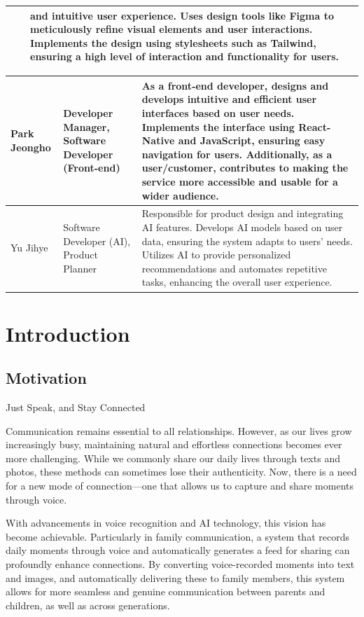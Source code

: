 \documentclass[conference]{IEEEtran}
\begin{document}
\begin{table}[htbp]
\begin{tabular}{|p{1cm}|p{1.7cm}|p{5cm}|}
    \hline
    & & and intuitive user experience. Uses design tools like Figma to meticulously refine visual elements and user interactions. Implements the design using stylesheets such as Tailwind, ensuring a high level of interaction and functionality for users.\\
    \hline
\end{tabular}

 \begin{tabular}{|p{1cm}|p{1.7cm}|p{5cm}|}
    Park Jeongho & Developer Manager, Software Developer (Front-end) & As a front-end developer, designs and develops intuitive and efficient user interfaces based on user needs. Implements the interface using React-Native and JavaScript, ensuring easy navigation for users. Additionally, as a user/customer, contributes to making the service more accessible and usable for a wider audience.\\
    \hline
    Yu Jihye & Software Developer (AI), Product Planner& Responsible for product design and integrating AI features. Develops AI models based on user data, ensuring the system adapts to users' needs. Utilizes AI to provide personalized recommendations and automates repetitive tasks, enhancing the overall user experience.\\
    \hline
\end{tabular}
\end{table}

\section{Introduction}
    \subsection{Motivation}
    Just Speak, and Stay Connected

    Communication remains essential to all relationships. However, as our lives grow increasingly busy, maintaining natural and effortless connections becomes ever more challenging. While we commonly share our daily lives through texts and photos, these methods can sometimes lose their authenticity. Now, there is a need for a new mode of connection—one that allows us to capture and share moments through voice.

    With advancements in voice recognition and AI technology, this vision has become achievable. Particularly in family communication, a system that records daily moments through voice and automatically generates a feed for sharing can profoundly enhance connections. By converting voice-recorded moments into text and images, and automatically delivering these to family members, this system allows for more seamless and genuine communication between parents and children, as well as across generations.
\end{document}
